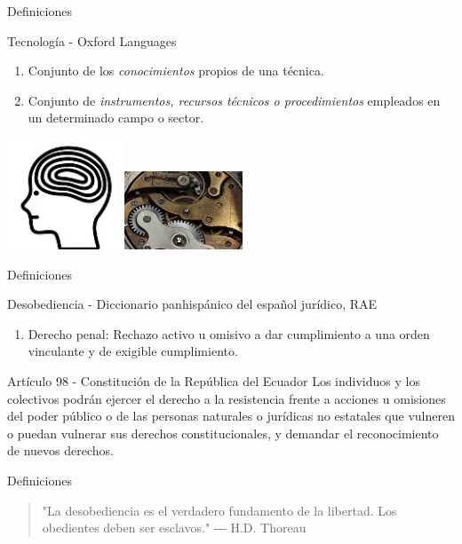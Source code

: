 \documentclass[spanish]{beamer}
\begin{document}
\begin{frame}{Definiciones}
    \begin{block}{Tecnología - Oxford Languages}
        \begin{enumerate}
            \item Conjunto de los \emph{conocimientos} propios de una técnica.
            \item Conjunto de \emph{instrumentos, recursos técnicos o procedimientos} empleados en un determinado campo o sector.
        \end{enumerate}                             
    \end{block}
    \centering
    \includegraphics[width=3.5cm]{img/mind.jpg}\includegraphics[width=3.5cm]{img/clockwork.jpg}
\end{frame}
\begin{frame}{Definiciones}
    \begin{block}{Desobediencia - Diccionario panhispánico del español jurídico, RAE}
        \begin{enumerate}
            \item Derecho penal: Rechazo activo u omisivo a dar cumplimiento a una orden vinculante y de exigible cumplimiento.
        \end{enumerate}
    \end{block}
    \begin{block}{Artículo 98 - Constitución de la República del Ecuador}
        Los individuos y los colectivos podrán ejercer el derecho a la resistencia frente a acciones u omisiones del poder público o de las personas naturales o jurídicas no estatales que vulneren o puedan vulnerar sus derechos constitucionales, y demandar el reconocimiento de nuevos derechos.
    \end{block}
\end{frame}
\begin{frame}{Definiciones}
    \begin{quote}
        "La desobediencia es el verdadero fundamento de la libertad. Los obedientes deben ser esclavos." ― H.D. Thoreau
    \end{quote}
\end{frame}
\end{document}
